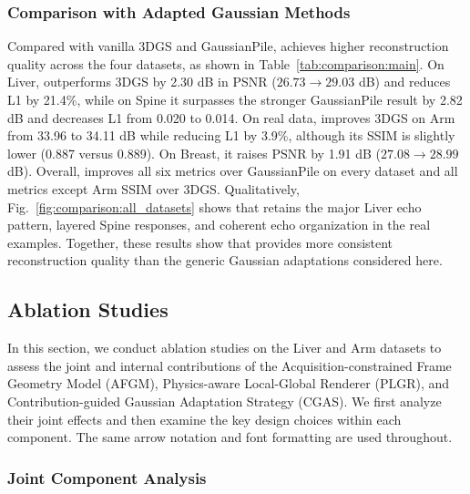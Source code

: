 \subsubsection{Comparison with Adapted Gaussian Methods}

Compared with vanilla 3DGS and GaussianPile, \methodname{} achieves higher
reconstruction quality across the four datasets, as shown in
Table~\ref{tab:comparison:main}. On Liver, \methodname{} outperforms 3DGS by
2.30 dB in PSNR ($26.73\!\rightarrow\!29.03$ dB) and reduces L1 by 21.4\%,
while on Spine it surpasses the stronger GaussianPile result by 2.82 dB and
decreases L1 from 0.020 to 0.014. On real data, \methodname{} improves 3DGS
on Arm from 33.96 to 34.11 dB while reducing L1 by 3.9\%, although its SSIM
is slightly lower (0.887 versus 0.889). On Breast, it raises PSNR by 1.91 dB
($27.08\!\rightarrow\!28.99$ dB). Overall, \methodname{} improves all six
metrics over GaussianPile on every dataset and all metrics except Arm SSIM
over 3DGS.
Qualitatively, Fig.~\ref{fig:comparison:all_datasets} shows that
\methodname{} retains the major Liver echo pattern, layered Spine responses,
and coherent echo organization in the real examples. Together, these results
show that \methodname{} provides more consistent reconstruction quality than
the generic Gaussian adaptations considered here.



\vspace{-3mm}
\subsection{Ablation Studies}
\label{sec:results:ablation}

In this section, we conduct ablation studies on the Liver and Arm datasets to
assess the joint and internal contributions of the Acquisition-constrained
Frame Geometry Model (AFGM), Physics-aware Local-Global Renderer (PLGR), and
Contribution-guided Gaussian Adaptation Strategy (CGAS). We first analyze
their joint effects and then examine the key design choices within each
component. The same arrow notation and font formatting are used throughout.



\subsubsection{Joint Component Analysis}

